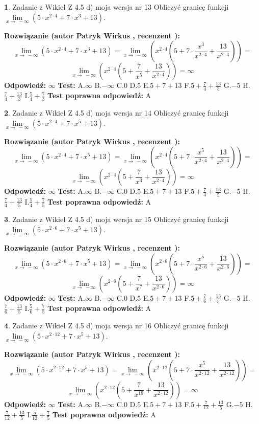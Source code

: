 \documentclass[12pt, a4paper]{article}
\theoremstyle{definition} %
\newtheorem{zad}{}
\newcommand{\zadStart}[1]{\begin{zad}#1\newline}
\newcommand{\zadStop}{\end{zad}}
\newcommand{\rozwStart}[2]{\noindent \textbf{Rozwiązanie (autor #1 , recenzent #2): }\newline}
\newcommand{\rozwStop}{\newline}
\newcommand{\odpStart}{\noindent \textbf{Odpowiedź:}\newline}
\newcommand{\odpStop}{\newline}
\newcommand{\testStart}{\noindent \textbf{Test:}\newline}
\newcommand{\testStop}{\newline}
\newcommand{\kluczStart}{\noindent \textbf{Test poprawna odpowiedź:}\newline}
\newcommand{\kluczStop}{\newline}
\begin{document}
\zadStart{Zadanie z Wikieł Z 4.5 d) moja wersja nr 13}
Obliczyć granicę funkcji  $\lim\limits_{x\to\ -\infty}(5 \cdot x^{2\cdot4}+7 \cdot x^{3}+13)$.
\zadStop
\rozwStart{Patryk Wirkus}{}
$$\lim\limits_{x\to\ -\infty}(5 \cdot x^{2\cdot4}+7 \cdot x^{3}+13) = \lim\limits_{x\to\ -\infty}(x^{2\cdot4}(5 +7 \cdot \frac{x^{3}}{x^{2\cdot4}}+\frac{13}{x^{2\cdot4}})) =$$ $$\lim\limits_{x\to\ -\infty}(x^{2\cdot4}(5 +\frac{7}{x^{5}}+\frac{13}{x^{2\cdot4}})) =\infty$$
\rozwStop
\odpStart
$\infty$
\odpStop
\testStart
A.$\infty$ B.$-\infty$ C.$0$ D.$5$ E.$5 + 7 + 13$
F.$5+\frac{7}{4}+\frac{13}{3}$ G.$-5$
H.$\frac{7}{4}+\frac{13}{3}$
I.$\frac{5}{4}+\frac{7}{3}$
\testStop
\kluczStart
A
\kluczStop



\zadStart{Zadanie z Wikieł Z 4.5 d) moja wersja nr 14}
Obliczyć granicę funkcji  $\lim\limits_{x\to\ -\infty}(5 \cdot x^{2\cdot4}+7 \cdot x^{5}+13)$.
\zadStop
\rozwStart{Patryk Wirkus}{}
$$\lim\limits_{x\to\ -\infty}(5 \cdot x^{2\cdot4}+7 \cdot x^{5}+13) = \lim\limits_{x\to\ -\infty}(x^{2\cdot4}(5 +7 \cdot \frac{x^{5}}{x^{2\cdot4}}+\frac{13}{x^{2\cdot4}})) =$$ $$\lim\limits_{x\to\ -\infty}(x^{2\cdot4}(5 +\frac{7}{x^{3}}+\frac{13}{x^{2\cdot4}})) =\infty$$
\rozwStop
\odpStart
$\infty$
\odpStop
\testStart
A.$\infty$ B.$-\infty$ C.$0$ D.$5$ E.$5 + 7 + 13$
F.$5+\frac{7}{4}+\frac{13}{5}$ G.$-5$
H.$\frac{7}{4}+\frac{13}{5}$
I.$\frac{5}{4}+\frac{7}{5}$
\testStop
\kluczStart
A
\kluczStop



\zadStart{Zadanie z Wikieł Z 4.5 d) moja wersja nr 15}
Obliczyć granicę funkcji  $\lim\limits_{x\to\ -\infty}(5 \cdot x^{2\cdot6}+7 \cdot x^{5}+13)$.
\zadStop
\rozwStart{Patryk Wirkus}{}
$$\lim\limits_{x\to\ -\infty}(5 \cdot x^{2\cdot6}+7 \cdot x^{5}+13) = \lim\limits_{x\to\ -\infty}(x^{2\cdot6}(5 +7 \cdot \frac{x^{5}}{x^{2\cdot6}}+\frac{13}{x^{2\cdot6}})) =$$ $$\lim\limits_{x\to\ -\infty}(x^{2\cdot6}(5 +\frac{7}{x^{7}}+\frac{13}{x^{2\cdot6}})) =\infty$$
\rozwStop
\odpStart
$\infty$
\odpStop
\testStart
A.$\infty$ B.$-\infty$ C.$0$ D.$5$ E.$5 + 7 + 13$
F.$5+\frac{7}{6}+\frac{13}{5}$ G.$-5$
H.$\frac{7}{6}+\frac{13}{5}$
I.$\frac{5}{6}+\frac{7}{5}$
\testStop
\kluczStart
A
\kluczStop



\zadStart{Zadanie z Wikieł Z 4.5 d) moja wersja nr 16}
Obliczyć granicę funkcji  $\lim\limits_{x\to\ -\infty}(5 \cdot x^{2\cdot12}+7 \cdot x^{5}+13)$.
\zadStop
\rozwStart{Patryk Wirkus}{}
$$\lim\limits_{x\to\ -\infty}(5 \cdot x^{2\cdot12}+7 \cdot x^{5}+13) = \lim\limits_{x\to\ -\infty}(x^{2\cdot12}(5 +7 \cdot \frac{x^{5}}{x^{2\cdot12}}+\frac{13}{x^{2\cdot12}})) =$$ $$\lim\limits_{x\to\ -\infty}(x^{2\cdot12}(5 +\frac{7}{x^{19}}+\frac{13}{x^{2\cdot12}})) =\infty$$
\rozwStop
\odpStart
$\infty$
\odpStop
\testStart
A.$\infty$ B.$-\infty$ C.$0$ D.$5$ E.$5 + 7 + 13$
F.$5+\frac{7}{12}+\frac{13}{5}$ G.$-5$
H.$\frac{7}{12}+\frac{13}{5}$
I.$\frac{5}{12}+\frac{7}{5}$
\testStop
\kluczStart
A
\kluczStop
\end{document}
